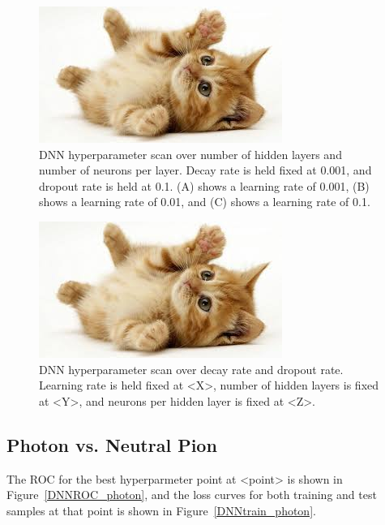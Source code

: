 \documentclass{article}
\begin{document}
    \begin{figure}
        \begin{center}
            \includegraphics{images/cat-thumb.jpeg}
        \end{center}
        \caption{DNN hyperparameter scan over number of hidden layers and number of neurons per layer. Decay rate is held fixed at 0.001, and dropout rate is held at 0.1. (A) shows a learning rate of 0.001, (B) shows a learning rate of 0.01, and (C) shows a learning rate of 0.1.}
        \label{DNNscan1}
    \end{figure}

    \begin{figure}
        \begin{center}
            \includegraphics{images/cat-thumb.jpeg}
        \end{center}
        \caption{DNN hyperparameter scan over decay rate and dropout rate. Learning rate is held fixed at <X>, number of hidden layers is fixed at <Y>, and neurons per hidden layer is fixed at <Z>.}
        \label{DNNscan2}
    \end{figure}

    \subsection*{Photon vs. Neutral Pion}

    The ROC for the best hyperparmeter point at <point> is shown in Figure~\ref{DNNROC_photon}, and the loss curves for both training and test samples at that point is shown in Figure~\ref{DNNtrain_photon}.
\end{document}

